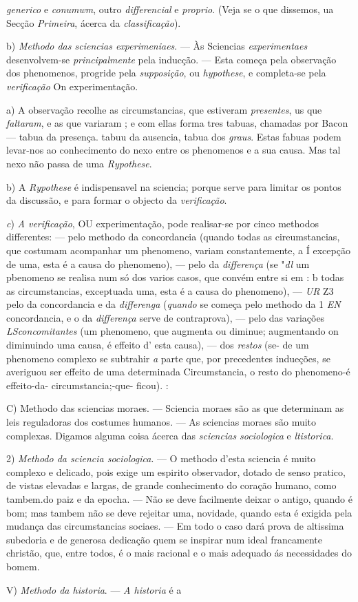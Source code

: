 \emph{generico} e \emph{conumwm}, outro \emph{differencial} e \emph{proprio}. (Veja se o que dissemos, ua Secção \emph{Primeira}, ácerca da \emph{classificação}).\par b) \emph{Methodo das sciencias experimeniaes}. --- Às Sciencias \emph{experimentaes} desenvolvem-se \emph{principalmente} pela inducção. --- Esta começa pela observação dos phenomenos, progride pela \emph{supposição}, ou \emph{hypothese}, e completa-se pela \emph{verificação} On experimentação.\par a) A observação recolhe as circumstancias, que estiveram \emph{presentes}, us que \emph{faltaram}, e as que variaram ; e com ellas forma tres tabuas, chamadas por Bacon --- tabua da presença. tabuu da ausencia, tabua dos \emph{graus}. Estas fabuas podem levar-nos ao conhecimento do nexo entre os phenomenos e a sua causa. Mas tal nexo não passa de uma \emph{Rypothese}.\par b) A \emph{Rypothese} é indispensavel na sciencia; porque serve para limitar os pontos da discussão, e para formar o objecto da \emph{verificação}.\par \emph{c}) \emph{A verificação}, OU experimentação, pode realisar-se por cinco methodos differentes: --- pelo methodo da concordancia (quando todas as cireumstancias, que costumam acompanhar um phenomeno, variam constantemente, a Í excepção de uma, esta é a causa do phenomeno), --- pelo da \emph{differença} (se "\emph{dl} um pbenomeno se realisa num só dos varios casos, que convém entre si em : b todas as circumstancias, exceptuada uma, esta é a causa do phenomeno), --- \emph{UR} Z3 pelo da concordancia e da \emph{differenga} (\emph{quando} se começa pelo methodo da 1 \emph{EN} concordancia, e o da \emph{differença} serve de contraprova), --- pelo das variações \emph{LS}\emph{concomitantes} (um phenomeno, que augmenta ou diminue; augmentando on diminuindo uma causa, é effeito d' esta causa), --- dos \emph{restos} (se- de um phenomeno complexo se subtrahir \emph{a} parte que, por precedentes indueções, se averiguou ser effeito de uma determinada Circumstancia, o resto do phenomeno-é effeito-da- circumstancia;-que- ficou). :\par C) Methodo das sciencias moraes. --- Sciencia moraes são as que determinam as leis reguladoras dos costumes humanos. --- As sciencias moraes são muito complexas. Digamos alguma coisa ácerca das \emph{sciencias sociologica} e \emph{ltistorica}.\par 2) \emph{Methodo da sciencia sociologica}. --- O methodo d'esta sciencia é muito complexo e delicado, pois exige um espirito observador, dotado de senso pratico, de vistas elevadas e largas, de grande conhecimento do coração humano, como tambem.do paiz e da epocha. --- Não se deve facilmente deixar o antigo, quando é bom; mas tambem não se deve rejeitar uma, novidade, quando esta é exigida pela mudança das circumstancias sociaes. --- Em todo o caso dará prova de altissima subedoria e de generosa dedicação quem se inspirar num ideal francamente christão, que, entre todos, é o mais racional e o mais adequado ás necessidades do bomem.\par V) \emph{Methodo da historia}. --- \emph{A historia} é a 